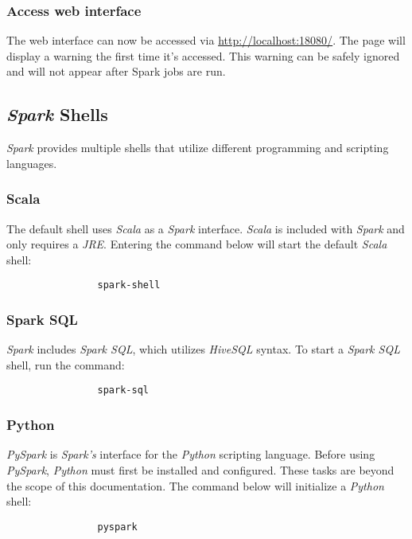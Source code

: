 \documentclass{article}
\begin{document}
            \subsubsection{Access web interface}
            The web interface can now be accessed via \url{http://localhost:18080/}. The page will
            display a warning the first time it's accessed. This warning can be safely ignored and will
            not appear after Spark jobs are run.

        \subsection{\emph{Spark} Shells}
        \emph{Spark} provides multiple shells that utilize different programming and scripting languages.

            \subsubsection{Scala}
            The default shell uses \emph{Scala} as a \emph{Spark} interface. \emph{Scala} is included
            with \emph{Spark} and only requires a \emph{JRE}. Entering the command below will start
            the default \emph{Scala} shell:
            \begin{verbatim}
                spark-shell
            \end{verbatim}

            \subsubsection{Spark SQL}
            \emph{Spark} includes \emph{Spark SQL}, which utilizes \emph{HiveSQL} syntax. To start
            a \emph{Spark SQL} shell, run the command:
            \begin{verbatim}
                spark-sql
            \end{verbatim}

            \subsubsection{Python}
            \emph{PySpark} is \emph{Spark's} interface for the \emph{Python} scripting language.
            Before using \emph{PySpark}, \emph{Python} must first be installed and configured.
            These tasks are beyond the scope of this documentation. The command below will initialize
            a \emph{Python} shell:
            \begin{verbatim}
                pyspark
            \end{verbatim}
\end{document}
